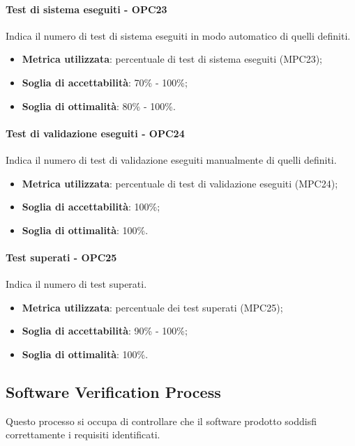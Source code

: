 \documentclass[PianoDiQualifica.tex]{subfiles}
\begin{document}
			\paragraph{Test di sistema eseguiti - OPC23}
				Indica il numero di test di sistema eseguiti in modo automatico di quelli definiti.
				\begin{itemize}
					\item \textbf{Metrica utilizzata}: percentuale di test di sistema eseguiti (MPC23);
					\item \textbf{Soglia di accettabilità}: 70\% - 100\%;
					\item \textbf{Soglia di ottimalità}: 80\% - 100\%.
				\end{itemize}
				
			\paragraph{Test di validazione eseguiti - OPC24}
				Indica il numero di test di validazione eseguiti manualmente di quelli definiti.
				\begin{itemize}
					\item \textbf{Metrica utilizzata}: percentuale di test di validazione eseguiti (MPC24);
					\item \textbf{Soglia di accettabilità}: 100\%;
					\item \textbf{Soglia di ottimalità}: 100\%.
				\end{itemize}
				
			\paragraph{Test superati - OPC25}
				Indica il numero di test superati.
				\begin{itemize}
					\item \textbf{Metrica utilizzata}: percentuale dei test superati (MPC25);
					\item \textbf{Soglia di accettabilità}: 90\% - 100\%;
					\item \textbf{Soglia di ottimalità}: 100\%.
				\end{itemize}
					
	\subsection{Software Verification Process}
		Questo processo si occupa di controllare che il software prodotto soddisfi correttamente i requisiti identificati.
		
\end{document}
